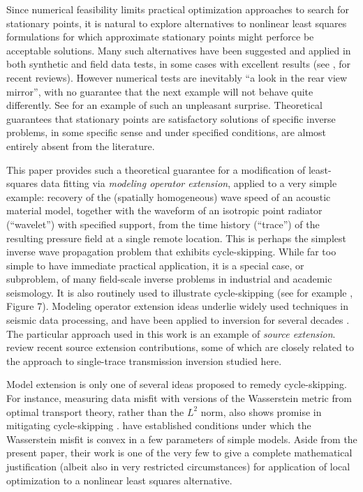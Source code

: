 Since numerical feasibility limits practical optimization approaches
to search for stationary points, it is natural to explore alternatives
to nonlinear least squares formulations for which approximate
stationary points might perforce be acceptable solutions. Many such
alternatives have been suggested and applied in both synthetic and
field data tests, in some cases with excellent results (see
\cite{HuangNammourSymesDollizal:SEG19},
\cite{PladysBrossierLiMetivier:GEO21} for recent reviews). However
numerical tests are inevitably ``a look in the rear view mirror'',
with no guarantee that the next example will not behave quite
differently. See \cite{Symes:2020} for an example of such an unpleasant
surprise. Theoretical guarantees that stationary points are
satisfactory solutions of specific inverse problems, in some specific
sense and under specified conditions, are almost entirely absent from
the literature.

This paper provides such a theoretical guarantee for a modification of
least-squares data fitting via {\em modeling operator extension},
applied to a very simple example: recovery of the (spatially
homogeneous) wave speed of an acoustic material model, together with
the waveform of an isotropic point radiator (``wavelet'') with
specified support, from the time history (``trace'') of the resulting
pressure field at a single remote location. This is perhaps the
simplest inverse wave propagation problem that exhibits
cycle-skipping. While far too simple to have immediate
practical application, it is a special case, or subproblem, of many
field-scale inverse problems in industrial and academic seismology. It
is also routinely used to illustrate cycle-skipping (see for example
\cite{VirieuxOperto:09}, Figure 7). Modeling operator extension ideas underlie
widely used techniques in seismic data processing, and have been
applied to inversion for several decades
\cite[]{geoprosp:2008}. The particular approach used in this work
is an example of {\em source extension}.
\cite{HuangNammourSymesDollizal:SEG19} review recent source extension
contributions, some of which are closely related to the approach to
single-trace transmission inversion studied here.

Model extension is only one of several ideas proposed to remedy
cycle-skipping. For instance, measuring data misfit with versions of the Wasserstein
metric from optimal transport theory, rather than the $L^2$ norm, also
shows promise in mitigating cycle-skipping
\cite[]{Metivier:GEO18,EngquistYang:GEO18,Ramos-Martinez:SEG18,Wang:SEG19,EngquistYang:CPAM21}. \cite{MahankaliYang:21}
have established conditions under which the Wasserstein misfit is
convex in a few parameters of simple models. Aside from the present
paper, their work is one of the very few to give a complete mathematical
justification (albeit also in very
restricted circumstances) for application of local optimization to a nonlinear
least squares alternative.

